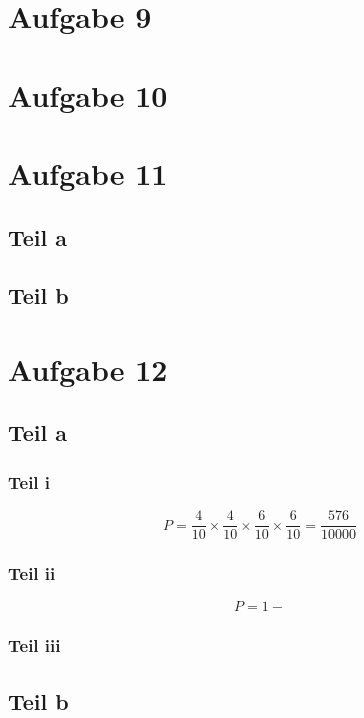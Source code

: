 \documentclass[10pt,a4paper]{article}
\begin{document}
\section{Aufgabe 9}

\section{Aufgabe 10}

\section{Aufgabe 11}

\subsection{Teil a}

\subsection{Teil b}

\section{Aufgabe 12}

\subsection{Teil a}

\subsubsection{Teil i}

\begin{equation}
  P = \frac{4}{10} \times \frac{4}{10} \times \frac{6}{10} \times \frac{6}{10} = \frac{576}{10000}
\end{equation}

\subsubsection{Teil ii}

\begin{equation}
  P = 1 - 
\end{equation}

\subsubsection{Teil iii}

\subsection{Teil b}
\end{document}
